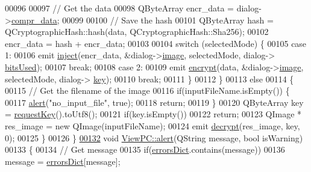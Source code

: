 \begin{DoxyCode}
00096 
00097         \textcolor{comment}{// Get the data}
00098         QByteArray encr\_data = dialog->\hyperlink{class_encrypt_dialog_a3e8998aa39696cbd1242f6420ef18143}{compr\_data};
00099 
00100         \textcolor{comment}{// Save the hash}
00101         QByteArray hash = QCryptographicHash::hash(data, QCryptographicHash::Sha256);
00102         encr\_data = hash + encr\_data;
00103 
00104         \textcolor{keywordflow}{switch} (selectedMode) \{
00105         \textcolor{keywordflow}{case} 1:
00106             emit \hyperlink{class_view_p_c_a652c98014c2df32178d43a5a9612dd99}{inject}(encr\_data, &dialog->\hyperlink{class_encrypt_dialog_a739a0df1d28d06b28a3fd16e2bc16c73}{image}, selectedMode, dialog->
      \hyperlink{class_encrypt_dialog_abf638fea37fbdbaba215954e2e239860}{bitsUsed});
00107             \textcolor{keywordflow}{break};
00108         \textcolor{keywordflow}{case} 2:
00109             emit \hyperlink{class_view_p_c_a9d179ff85ed8b1ca0ff7fa495965b52d}{encrypt}(data, &dialog->\hyperlink{class_encrypt_dialog_a739a0df1d28d06b28a3fd16e2bc16c73}{image}, selectedMode, dialog->
      \hyperlink{class_encrypt_dialog_a1afdef3c665fb0d0fae06d1df8e84951}{key});
00110             \textcolor{keywordflow}{break};
00111         \}
00112     \}
00113     \textcolor{keywordflow}{else}
00114     \{
00115         \textcolor{comment}{// Get the filename of the image}
00116         \textcolor{keywordflow}{if}(inputFileName.isEmpty()) \{
00117             \hyperlink{class_view_p_c_a7c467169467789561078abc9d4fe57bd}{alert}(\textcolor{stringliteral}{"no\_input\_file"}, \textcolor{keyword}{true});
00118             \textcolor{keywordflow}{return};
00119         \}
00120         QByteArray key = \hyperlink{class_view_p_c_a559c95675ec98b15451f3bca47033d9c}{requestKey}().toUtf8();
00121         \textcolor{keywordflow}{if}(key.isEmpty())
00122             \textcolor{keywordflow}{return};
00123         QImage * res\_image = \textcolor{keyword}{new} QImage(inputFileName);
00124         emit \hyperlink{class_view_p_c_a365df051360d557c7221474ad856e0af}{decrypt}(res\_image, key, 0);
00125     \}
00126 \}
\hypertarget{viewpc_8cpp_source.tex_l00132}{}\hyperlink{class_view_p_c_a7c467169467789561078abc9d4fe57bd}{00132} \textcolor{keywordtype}{void} \hyperlink{class_view_p_c_a7c467169467789561078abc9d4fe57bd}{ViewPC::alert}(QString message, \textcolor{keywordtype}{bool} isWarning)
00133 \{
00134     \textcolor{comment}{// Get message}
00135     \textcolor{keywordflow}{if}(\hyperlink{class_view_p_c_aaf7f058e5589d65fec72a21abfd5629b}{errorsDict}.contains(message))
00136         message = \hyperlink{class_view_p_c_aaf7f058e5589d65fec72a21abfd5629b}{errorsDict}[message];

\end{DoxyCode}
